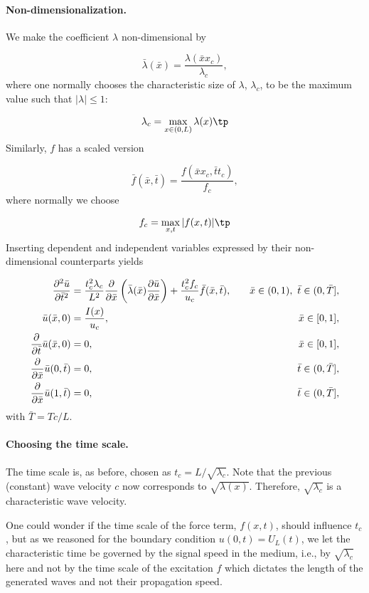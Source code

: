 \documentclass[graybox,envcountchap,sectrefs,final]{svmonodo}
\begin{document}
\paragraph{Non-dimensionalization.}
We make the coefficient $\lambda$ non-dimensional by

\begin{equation}
\bar\lambda(\bar x) = \frac{\lambda(\bar xx_c)}{\lambda_c},
\end{equation}
where one normally chooses the characteristic size of $\lambda$, $\lambda_c$,
to be the maximum value such that $|\lambda|\leq 1$:

\[ \lambda_c = \max_{x\in(0,L)}\lambda(x)\tp\]
Similarly, $f$ has a scaled version

\[ \bar f(\bar x,\bar t) = \frac{f(\bar x x_c, \bar t t_c)}{f_c},\]
where normally we choose

\[ f_c=\max_{x,t}|f(x,t)|\tp\]
Inserting dependent and independent variables expressed by their
non-dimensional counterparts yields

\begin{align*}
\frac{\partial^2 \bar u}{\partial \bar t^2} &=
\frac{t_c^2\lambda_c}{L^2}\frac{\partial}{\partial \bar x}\left(
\bar\lambda(\bar x) {\partial\bar u\over\partial\bar x}\right)
+ \frac{t_c^2f_c}{u_c}\bar f(\bar x,\bar t),
\quad & \bar x\in (0,1),\ \bar t\in (0,\bar T],\\ 
\bar u(\bar x,0) &= \frac{I(x)}{u_c},
\quad &\bar x\in [0,1],\\ 
{\partial\over\partial \bar t}\bar u(\bar x,0) &= 0,
\quad & \bar x\in [0,1],\\ 
\frac{\partial}{\partial \bar x}\bar u(0,\bar t) & = 0,
\quad  &\bar t\in (0,\bar T],\\ 
\frac{\partial}{\partial \bar x}\bar u(1,\bar t) & = 0,
\quad  &\bar t\in (0,\bar T],
\end{align*}
with $\bar T = Tc/L$.


\paragraph{Choosing the time scale.}
The time scale is, as before, chosen as $t_c
=L/\sqrt{\lambda_c}$. Note that the previous (constant) wave velocity
$c$ now corresponds to $\sqrt{\lambda (x)}$.  Therefore,
$\sqrt{\lambda_c}$ is a characteristic wave velocity.

One could wonder if the time scale of the force term, $f(x,t)$,
should influence $t_c$, but as we reasoned for the boundary condition
$u(0,t)=U_L(t)$, we let the characteristic time be governed by the
signal speed in the medium, i.e., by $\sqrt{\lambda_c}$ here and not
by the time scale of the excitation $f$ which dictates the
length of the generated waves and not their propagation speed.
\end{document}
